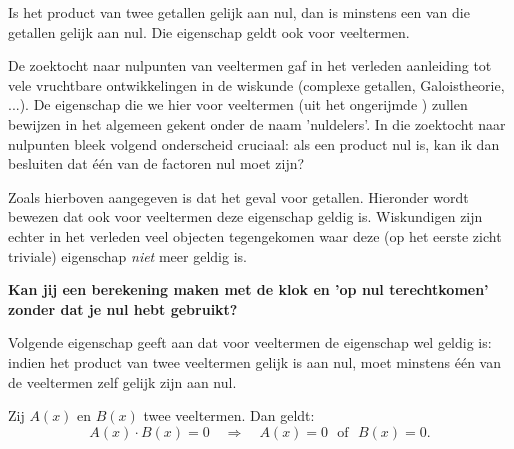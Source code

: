 \documentclass{ximera}
\begin{document}
	\author{Koen de Naeghel - Wiskunde Op Maat}
    \xmsource

	
Is het product van twee getallen gelijk aan nul, dan is minstens een van die getallen gelijk aan nul. Die eigenschap geldt ook voor veeltermen. 

De zoektocht naar nulpunten van veeltermen gaf in het verleden aanleiding tot vele vruchtbare ontwikkelingen in de wiskunde (complexe getallen, Galoistheorie, ...). De eigenschap die we hier voor veeltermen (uit het ongerijmde ) zullen bewijzen in het algemeen gekent onder de naam 'nuldelers'. In die zoektocht naar nulpunten bleek volgend onderscheid cruciaal: als een product nul is, kan ik dan besluiten dat één van de factoren nul moet zijn? 

Zoals hierboven aangegeven is dat het geval voor getallen. Hieronder wordt bewezen dat ook voor veeltermen deze eigenschap geldig is. Wiskundigen zijn echter in het verleden veel objecten tegengekomen waar deze (op het eerste zicht triviale) eigenschap \textit{niet} meer geldig is. 

\textbf{Kan jij een berekening maken met de klok en 'op nul terechtkomen' zonder dat je nul hebt gebruikt? }
	

Volgende eigenschap geeft aan dat voor veeltermen de eigenschap wel geldig is: indien het product van twee veeltermen gelijk is aan nul, moet minstens één van de veeltermen zelf gelijk zijn aan nul. 


\begin{proposition} 
Zij $A(x)$ en $B(x)$ twee veeltermen. Dan geldt: 
\[
A(x)\cdot B(x) = 0 \quad \Rightarrow \quad A(x) = 0 \,\,\text{ of } \,\, B(x) = 0.
\]
\end{proposition} 
\end{document}
